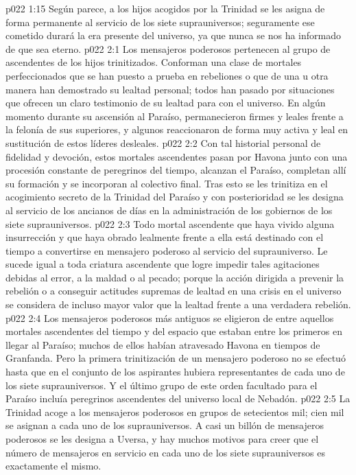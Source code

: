 \vs p022 1:15 Según parece, a los hijos acogidos por la Trinidad se les asigna de forma permanente al servicio de los siete suprauniversos; seguramente ese cometido durará la era presente del universo, ya que nunca se nos ha informado de que sea eterno.
\vs p022 2:1 Los mensajeros poderosos pertenecen al grupo de ascendentes de los hijos trinitizados. Conforman una clase de mortales perfeccionados que se han puesto a prueba en rebeliones o que de una u otra manera han demostrado su lealtad personal; todos han pasado por situaciones que ofrecen un claro testimonio de su lealtad para con el universo. En algún momento durante su ascensión al Paraíso, permanecieron firmes y leales frente a la felonía de sus superiores, y algunos reaccionaron de forma muy activa y leal en sustitución de estos líderes desleales.
\vs p022 2:2 Con tal historial personal de fidelidad y devoción, estos mortales ascendentes pasan por Havona junto con una procesión constante de peregrinos del tiempo, alcanzan el Paraíso, completan allí su formación y se incorporan al colectivo final. Tras esto se les trinitiza en el acogimiento secreto de la Trinidad del Paraíso y con posterioridad se les designa al servicio de los ancianos de días en la administración de los gobiernos de los siete suprauniversos.
\vs p022 2:3 Todo mortal ascendente que haya vivido alguna insurrección y que haya obrado lealmente frente a ella está destinado con el tiempo a convertirse en mensajero poderoso al servicio del suprauniverso. Le sucede igual a toda criatura ascendente que logre impedir tales agitaciones debidas al error, a la maldad o al pecado; porque la acción dirigida a prevenir la rebelión o a conseguir actitudes supremas de lealtad en una crisis en el universo se considera de incluso mayor valor que la lealtad frente a una verdadera rebelión.
\vs p022 2:4 Los mensajeros poderosos más antiguos se eligieron de entre aquellos mortales ascendentes del tiempo y del espacio que estaban entre los primeros en llegar al Paraíso; muchos de ellos habían atravesado Havona en tiempos de Granfanda. Pero la primera trinitización de un mensajero poderoso no se efectuó hasta que en el conjunto de los aspirantes hubiera representantes de cada uno de los siete suprauniversos. Y el último grupo de este orden facultado para el Paraíso incluía peregrinos ascendentes del universo local de Nebadón.
\vs p022 2:5 La Trinidad acoge a los mensajeros poderosos en grupos de setecientos mil; cien mil se asignan a cada uno de los suprauniversos. A casi un billón de mensajeros poderosos se les designa a Uversa, y hay muchos motivos para creer que el número de mensajeros en servicio en cada uno de los siete suprauniversos es exactamente el mismo.
